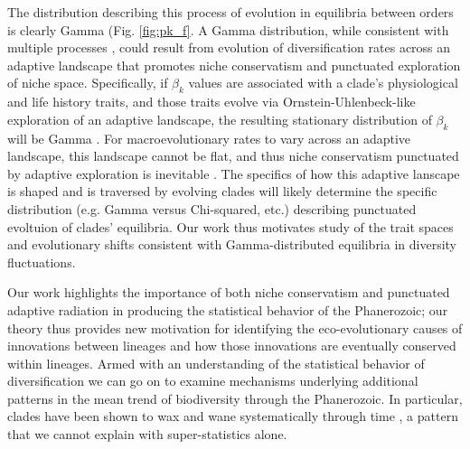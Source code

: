 \documentclass[12pt]{article}
\let\citep=\cite
\begin{document}
The distribution describing this process of evolution in equilibria
between orders is clearly Gamma (Fig. \ref{fig:pk_f}.  A Gamma
distribution, while consistent with multiple processes
\citep[e.g.][]{cir1985}, could result from evolution of
diversification rates across an adaptive landscape that promotes niche
conservatism and punctuated exploration of niche space.  Specifically,
if $\beta_k$ values are associated with a clade's physiological and
life history traits, and those traits evolve via
Ornstein-Uhlenbeck-like exploration of an adaptive landscape, the
resulting stationary distribution of $\beta_k$ will be Gamma
\citep{cir1985, butler2004}.  For macroevolutionary rates to vary
across an adaptive landscape, this landscape cannot be flat, and thus
niche conservatism punctuated by adaptive exploration is inevitable
\citep{newman1985adaptive}. The specifics of how this adaptive
lanscape is shaped and is traversed by evolving clades will likely
determine the specific distribution (e.g. Gamma versus Chi-squared,
etc.) describing punctuated evoltuion of clades' equilibria.  Our work
thus motivates study of the trait spaces and evolutionary shifts
consistent with Gamma-distributed equilibria in diversity
fluctuations.

Our work highlights the importance of both niche conservatism and
punctuated adaptive radiation in producing the statistical behavior of
the Phanerozoic; our theory thus provides new motivation for
identifying the eco-evolutionary causes of innovations between
lineages and how those innovations are eventually conserved within
lineages. Armed with an understanding of the statistical behavior of
diversification we can go on to examine mechanisms underlying
additional patterns in the mean trend of biodiversity through the
Phanerozoic. In particular, clades have been shown to wax and wane
systematically through time \citep{liow2007,
  quental2013}, a pattern that we cannot explain with super-statistics
alone.
\end{document}
